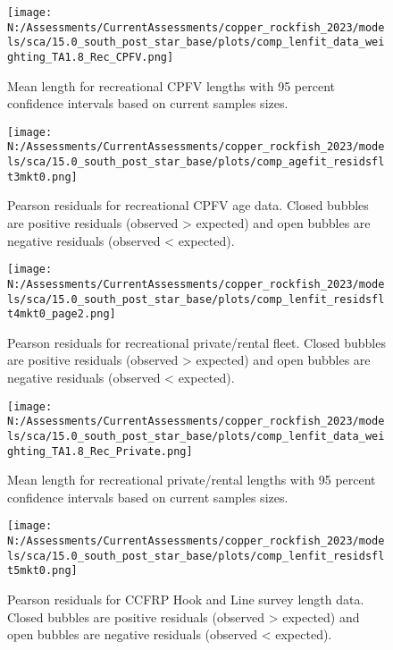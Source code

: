 \documentclass[11pt,
  english,
  letterpaper,
]{article}
\begin{document}
\pagebreak

\begin{figure}
\centering
\texttt{[image: N:/Assessments/CurrentAssessments/copper\_rockfish\_2023/models/sca/15.0\_south\_post\_star\_base/plots/comp\_lenfit\_data\_weighting\_TA1.8\_Rec\_CPFV.png]}
\caption{Mean length for recreational CPFV lengths with 95 percent confidence intervals based on current samples sizes.\label{fig:rec-cpfv-mean-len-fit}}
\end{figure}

\pagebreak

\begin{figure}
\centering
\texttt{[image: N:/Assessments/CurrentAssessments/copper\_rockfish\_2023/models/sca/15.0\_south\_post\_star\_base/plots/comp\_agefit\_residsflt3mkt0.png]}
\caption{Pearson residuals for recreational CPFV age data. Closed bubbles are positive residuals (observed \textgreater{} expected) and open bubbles are negative residuals (observed \textless{} expected).\label{fig:rec-cpfv-age-pearson}}
\end{figure}

\pagebreak

\begin{figure}
\centering
\texttt{[image: N:/Assessments/CurrentAssessments/copper\_rockfish\_2023/models/sca/15.0\_south\_post\_star\_base/plots/comp\_lenfit\_residsflt4mkt0\_page2.png]}
\caption{Pearson residuals for recreational private/rental fleet. Closed bubbles are positive residuals (observed \textgreater{} expected) and open bubbles are negative residuals (observed \textless{} expected).\label{fig:rec-pr-pearson}}
\end{figure}

\pagebreak

\begin{figure}
\centering
\texttt{[image: N:/Assessments/CurrentAssessments/copper\_rockfish\_2023/models/sca/15.0\_south\_post\_star\_base/plots/comp\_lenfit\_data\_weighting\_TA1.8\_Rec\_Private.png]}
\caption{Mean length for recreational private/rental lengths with 95 percent confidence intervals based on current samples sizes.\label{fig:rec-pr-mean-len-fit}}
\end{figure}

\pagebreak

\begin{figure}
\centering
\texttt{[image: N:/Assessments/CurrentAssessments/copper\_rockfish\_2023/models/sca/15.0\_south\_post\_star\_base/plots/comp\_lenfit\_residsflt5mkt0.png]}
\caption{Pearson residuals for CCFRP Hook and Line survey length data. Closed bubbles are positive residuals (observed \textgreater{} expected) and open bubbles are negative residuals (observed \textless{} expected).\label{fig:ccfrp-len-pearson}}
\end{figure}
\end{document}
